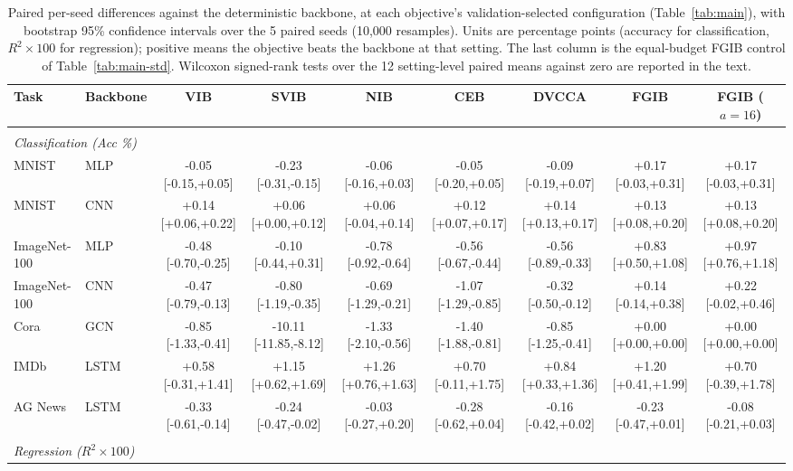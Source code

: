 \begin{table}[t]
\caption{Paired per-seed differences against the deterministic backbone, at each objective's validation-selected configuration (Table~\ref{tab:main}), with bootstrap 95\% confidence intervals over the 5 paired seeds (10{,}000 resamples). Units are percentage points (accuracy for classification, $R^2\times100$ for regression); positive means the objective beats the backbone at that setting. The last column is the equal-budget FGIB control of Table~\ref{tab:main-std}. Wilcoxon signed-rank tests over the 12 setting-level paired means against zero are reported in the text.}
\label{tab:paired}
\begin{center}\small
\begin{tabular}{llccccccc}
Task & Backbone & VIB & SVIB & NIB & CEB & DVCCA & FGIB & FGIB ($a{=}16$) \\ \hline \\[-1.8ex]
\multicolumn{9}{l}{\emph{Classification (Acc \%)}} \\[0.3ex]
MNIST & MLP & -0.05 [-0.15,+0.05] & -0.23 [-0.31,-0.15] & -0.06 [-0.16,+0.03] & -0.05 [-0.20,+0.05] & -0.09 [-0.19,+0.07] & +0.17 [-0.03,+0.31] & +0.17 [-0.03,+0.31] \\
MNIST & CNN & +0.14 [+0.06,+0.22] & +0.06 [+0.00,+0.12] & +0.06 [-0.04,+0.14] & +0.12 [+0.07,+0.17] & +0.14 [+0.13,+0.17] & +0.13 [+0.08,+0.20] & +0.13 [+0.08,+0.20] \\
ImageNet-100 & MLP & -0.48 [-0.70,-0.25] & -0.10 [-0.44,+0.31] & -0.78 [-0.92,-0.64] & -0.56 [-0.67,-0.44] & -0.56 [-0.89,-0.33] & +0.83 [+0.50,+1.08] & +0.97 [+0.76,+1.18] \\
ImageNet-100 & CNN & -0.47 [-0.79,-0.13] & -0.80 [-1.19,-0.35] & -0.69 [-1.29,-0.21] & -1.07 [-1.29,-0.85] & -0.32 [-0.50,-0.12] & +0.14 [-0.14,+0.38] & +0.22 [-0.02,+0.46] \\
Cora & GCN & -0.85 [-1.33,-0.41] & -10.11 [-11.85,-8.12] & -1.33 [-2.10,-0.56] & -1.40 [-1.88,-0.81] & -0.85 [-1.25,-0.41] & +0.00 [+0.00,+0.00] & +0.00 [+0.00,+0.00] \\
IMDb & LSTM & +0.58 [-0.31,+1.41] & +1.15 [+0.62,+1.69] & +1.26 [+0.76,+1.63] & +0.70 [-0.11,+1.75] & +0.84 [+0.33,+1.36] & +1.20 [+0.41,+1.99] & +0.70 [-0.39,+1.78] \\
AG News & LSTM & -0.33 [-0.61,-0.14] & -0.24 [-0.47,-0.02] & -0.03 [-0.27,+0.20] & -0.28 [-0.62,+0.04] & -0.16 [-0.42,+0.02] & -0.23 [-0.47,+0.01] & -0.08 [-0.21,+0.03] \\
\\[-1.5ex]
\multicolumn{9}{l}{\emph{Regression ($R^2\times100$)}} \\[0.3ex]

\end{tabular}
\end{center}
\end{table}
